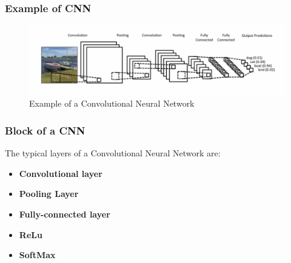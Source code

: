\documentclass{beamer}
\begin{document}

\begin{frame}
\frametitle{Example of CNN}
\begin{figure}[h]
	\begin{center}
		\includegraphics[scale=0.3]{CNN.png}
		\caption{Example of a Convolutional Neural Network}
		\label{fig:CNN}
	\end{center}
\end{figure}

\end{frame}


\begin{frame}
\frametitle{Block of a CNN}
The typical layers of a Convolutional Neural Network are:

\begin{itemize}

\item \textbf{Convolutional layer}

\item \textbf{Pooling Layer}

\item \textbf{Fully-connected layer}

\item \textbf{ReLu}

\item \textbf{SoftMax}

\end{itemize}

\end{frame}

\end{document}

